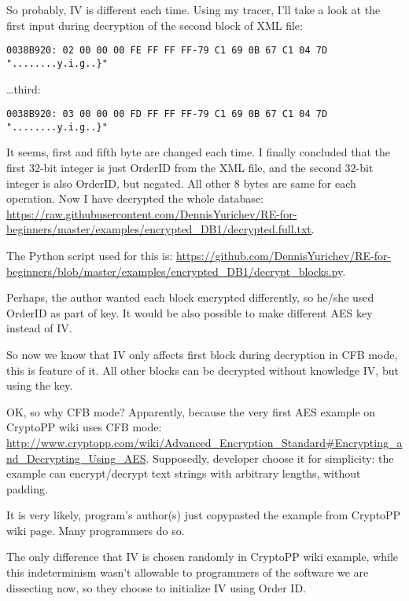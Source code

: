 So probably, \ac{IV} is different each time.
Using my tracer, I'll take a look at the first input during decryption of the second block
of \ac{XML} file:

\begin{lstlisting}
0038B920: 02 00 00 00 FE FF FF FF-79 C1 69 0B 67 C1 04 7D "........y.i.g..}"
\end{lstlisting}

\dots third:

\begin{lstlisting}
0038B920: 03 00 00 00 FD FF FF FF-79 C1 69 0B 67 C1 04 7D "........y.i.g..}"
\end{lstlisting}

It seems, first and fifth byte are changed each time.
I finally concluded that the first 32-bit integer is just OrderID from the \ac{XML} file,
and the second 32-bit integer is also OrderID, but negated. All other 8 bytes are same for each operation.
Now I have decrypted the whole database:
\url{https://raw.githubusercontent.com/DennisYurichev/RE-for-beginners/master/examples/encrypted_DB1/decrypted.full.txt}.

The Python script used for this is:
\url{https://github.com/DennisYurichev/RE-for-beginners/blob/master/examples/encrypted_DB1/decrypt_blocks.py}.

Perhaps, the author wanted each block encrypted differently, so he/she used OrderID as part of key.
It would be also possible to make different AES key instead of \ac{IV}.

So now we know that \ac{IV} only affects first block during decryption in \ac{CFB} mode, this is
feature of it.
All other blocks can be decrypted without knowledge \ac{IV}, but using the key.

OK, so why \ac{CFB} mode? Apparently, because the very first AES example on CryptoPP wiki
uses \ac{CFB} mode:
\url{http://www.cryptopp.com/wiki/Advanced_Encryption_Standard#Encrypting_and_Decrypting_Using_AES}.
Supposedly, developer choose it for simplicity:
the example can encrypt/decrypt text strings with arbitrary lengths, without padding.

It is very likely, program's author(s) just copypasted the example from CryptoPP wiki page.
Many programmers do so.

The only difference that \ac{IV} is chosen randomly in CryptoPP wiki example, while this indeterminism
wasn't allowable to programmers of the software we are dissecting now,
so they choose to initialize \ac{IV} using Order ID.

